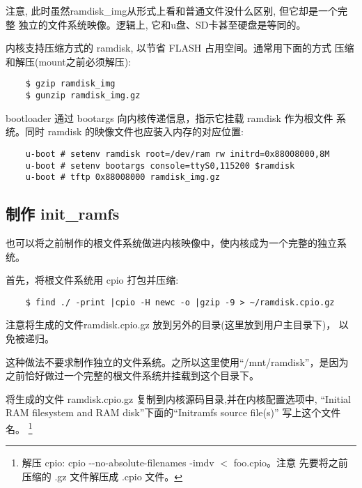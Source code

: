 	注意, 此时虽然ramdisk\_img从形式上看和普通文件没什么区别, 但它却是一个完整
独立的文件系统映像。逻辑上, 它和u盘、SD卡甚至硬盘是等同的。

	内核支持压缩方式的 ramdisk, 以节省 FLASH 占用空间。通常用下面的方式
压缩和解压(mount之前必须解压):

\begin{boxedminipage}{.9\textwidth}
\begin{verbatim}
	$ gzip ramdisk_img
	$ gunzip ramdisk_img.gz
\end{verbatim}
\end{boxedminipage}

	bootloader 通过 bootargs 向内核传递信息，指示它挂载 ramdisk 作为根文件
系统。同时 ramdisk 的映像文件也应装入内存的对应位置:

\begin{boxedminipage}{.9\textwidth}
\begin{verbatim}
	u-boot # setenv ramdisk root=/dev/ram rw initrd=0x88008000,8M
	u-boot # setenv bootargs console=ttyS0,115200 $ramdisk
	u-boot # tftp 0x88008000 ramdisk_img.gz
\end{verbatim}
\end{boxedminipage}

\subsection{制作 init\_ramfs}
	也可以将之前制作的根文件系统做进内核映像中，使内核成为一个完整的独立系统。

	首先，将根文件系统用 cpio 打包并压缩:

\begin{boxedminipage}{.9\textwidth}
\begin{verbatim}
	$ find ./ -print |cpio -H newc -o |gzip -9 > ~/ramdisk.cpio.gz
\end{verbatim}
\end{boxedminipage}

    注意将生成的文件ramdisk.cpio.gz 放到另外的目录(这里放到用户主目录下)，
    以免被递归。

	这种做法不要求制作独立的文件系统。之所以这里使用``/mnt/ramdisk''，是因为
之前恰好做过一个完整的根文件系统并挂载到这个目录下。

	将生成的文件 ramdisk.cpio.gz 复制到内核源码目录,并在内核配置选项中,
``Initial RAM filesystem and RAM disk''下面的``Initramfs source file(s)''
写上这个文件名。
\footnote{解压 cpio: cpio -{}-no-absolute-filenames -imdv $<$ foo.cpio。注意
    先要将之前压缩的 .gz 文件解压成 .cpio 文件。}

